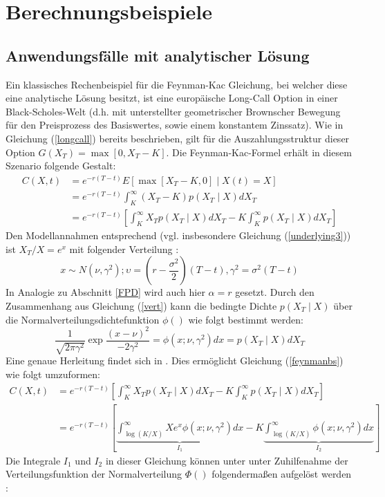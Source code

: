 \documentclass[12pt,a4paper,headsepline,bibliography=totoc,listof=totoc,headinclude=false,footinclude=false,BCOR5mm]{scrreprt} %
\begin{document}
\section{Berechnungsbeispiele} 
\subsection{Anwendungsf\"alle mit analytischer L\"osung} \label{anwendung}
Ein klassisches Rechenbeispiel f\"ur die Feynman-Kac Gleichung, bei welcher diese  eine analytische L\"osung besitzt, ist eine europ\"aische Long-Call Option in einer Black-Scholes-Welt (d.h. mit unterstellter geometrischer Brownscher Bewegung f\"ur den Preisprozess des Basiswertes, sowie einem konstantem Zinssatz).
Wie in Gleichung (\ref{longcall}) bereits beschrieben, gilt f\"ur die Auszahlungsstruktur dieser Option $G(X_{T}) = \max[0,X_{T}-K]$. Die Feynman-Kac-Formel erh\"alt in diesem Szenario folgende Gestalt:
\begin{equation} \label{feynmanbs}\begin{split}
C(X,t) &=e^{-r(T-t)}  E \left [\max[X_{T}-K,0] \mid X(t) = X \right ]  \\ &= e^{-r(T-t)}  \int_{K}^{\infty} (X_{T}-K) p(X_{T}\mid X)dX_{T} \\ &= e^{-r(T-t)} \left[ \int_{K}^{\infty} X_{T} p(X_{T}\mid X)dX_{T} -K\int_{K}^{\infty} p(X_{T}\mid X)dX_{T} \right]
\end{split}
\end{equation}
Den Modellannahmen entsprechend (vgl. insbesondere Gleichung (\ref{underlying3})) ist $X_{T}/X=e^x$ mit folgender Verteilung \cite[S. 240]{Singer1999}:
\begin{equation}\label{vert}  x \sim N(\nu, \gamma^2) ; \upsilon = (r - \frac{\sigma^2}{2})(T-t), \gamma^2 = \sigma^2(T-t)
\end{equation}
In Analogie zu Abschnitt \ref{FPD} wird auch hier  $\alpha = r$ gesetzt. Durch den Zusammenhang aus Gleichung (\ref{vert}) kann die bedingte Dichte $p(X_T\mid X)$ \"uber die Normalverteilungsdichtefunktion $\phi()$ wie folgt bestimmt werden: 
\begin{equation}\label{beddicht} \frac{1}{\sqrt{2 \pi \gamma^2}} \exp  \frac{(x-\nu)^2}{-2\gamma^2}  =\phi(x; \nu,\gamma^2)dx = p(X_T\mid X)dX_T
\end{equation} Eine genaue Herleitung findet sich in \cite[S. 134 ff]{Linetsky1998}.
Dies erm\"oglicht Gleichung (\ref{feynmanbs}) wie folgt umzuformen:
\begin{equation} \label{feynmanbsII}\begin{split}
C(X,t) &= e^{-r(T-t)} \left[ \int_{K}^{\infty} X_{T} p(X_{T}\mid X)dX_{T} - K \int_{K}^{\infty} p(X_{T}\mid X)dX_{T} \right] \\
&=e^{-r(T-t)} \left[ \underbrace{\int_{\log(K/X)}^{\infty} Xe^{x} \phi(x; \nu,\gamma^2)dx}_{I_1} - K \underbrace{\int_{\log(K/X)}^{\infty} \phi(x; \nu,\gamma^2)dx}_{I_2} \right]
\end{split}\end{equation}
Die Integrale $I_1$ und $I_2$ in dieser Gleichung k\"onnen unter unter Zuhilfenahme der Verteilungsfunktion der Normalverteilung $\Phi()$ folgenderma{\ss}en aufgel\"ost werden {\cite[S. 203ff]{Hausmann2002}:}
\newpage
\end{document}
